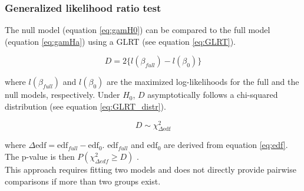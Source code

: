 \subsubsection{Generalized likelihood ratio test} \label{suppl_glrt}

The null model (equation \ref{eq:gamH0}) can be compared to the full model (equation \ref{eq:gamHa}) using a GLRT (see equation \ref{eq:GLRT}).

\begin{equation}
    D = 2\{l(\beta_{full}) - l(\beta_{0})\}
    \label{eq:GLRT}
\end{equation}

where $l(\beta_{full})$ and $l(\beta_{0})$ are the maximized log-likelihoods for the full and the null models, respectively. Under $H_0$, $D$ asymptotically follows a chi-squared distribution (see equation \ref{eq:GLRT_distr}).

\begin{equation}
    D \sim  \chi^{2}_{\Delta \text{edf}}
    \label{eq:GLRT_distr}
\end{equation}

where $\Delta \text{edf} = \text{edf}_{full} - \text{edf}_0$. $\text{edf}_{full}$ and $\text{edf}_0$ are derived from equation \ref{eq:edf}. The p-value is then $P(\chi^2_{\Delta edf} \geq D)$ \cite{gambook_gamtheory_glrt}.\\

This approach requires fitting two models and does not directly provide pairwise comparisons if more than two groups exist.
